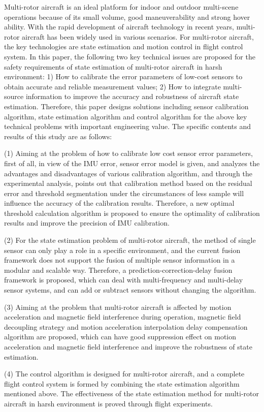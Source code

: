 \documentclass[
  type=master
]{gdutthesis}
\begin{document}
\begin{abstract*}
  Multi-rotor aircraft is an ideal platform for indoor and outdoor multi-scene operations because of its small volume, good maneuverability and strong hover ability.
  With the rapid development of aircraft technology in recent years, multi-rotor aircraft has been widely used in various scenarios.
  For multi-rotor aircraft, the key technologies are state estimation and motion control in flight control system.
  In this paper, the following two key technical issues are proposed for the safety requirements of state estimation of multi-rotor aircraft in harsh environment:
  1) How to calibrate the error parameters of low-cost sensors to obtain accurate and reliable measurement values;
  2) How to integrate multi-source information to improve the accuracy and robustness of aircraft state estimation.
  Therefore, this paper designs solutions including sensor calibration algorithm, state estimation algorithm and control algorithm for the above key technical problems with important engineering value.
  The specific contents and results of this study are as follows:
  
  (1) Aiming at the problem of how to calibrate low cost sensor error parameters, first of all, in view of the IMU error, sensor error model is given, and analyzes the advantages and disadvantages of various calibration algorithm, and through the experimental analysis, points out that calibration method based on the residual error and threshold segmentation under the circumstances of less sample will influence the accuracy of the calibration results.
  Therefore, a new optimal threshold calculation algorithm is proposed to ensure the optimality of calibration results and improve the precision of IMU calibration.
  
  (2) For the state estimation problem of multi-rotor aircraft, the method of single sensor can only play a role in a specific environment, and the current fusion framework does not support the fusion of multiple sensor information in a modular and scalable way.
  Therefore, a prediction-correction-delay fusion framework is proposed, which can deal with multi-frequency and multi-delay sensor systems, and can add or subtract sensors without changing the algorithm.
  
  (3) Aiming at the problem that multi-rotor aircraft is affected by motion acceleration and magnetic field interference during operation, magnetic field decoupling strategy and motion acceleration interpolation delay compensation algorithm are proposed, which can have good suppression effect on motion acceleration and magnetic field interference and improve the robustness of state estimation.
  
  (4) The control algorithm is designed for multi-rotor aircraft, and a complete flight control system is formed by combining the state estimation algorithm mentioned above. The effectiveness of the state estimation method for multi-rotor aircraft in harsh environment is proved through flight experiments.  
\end{abstract*}
\end{document}
